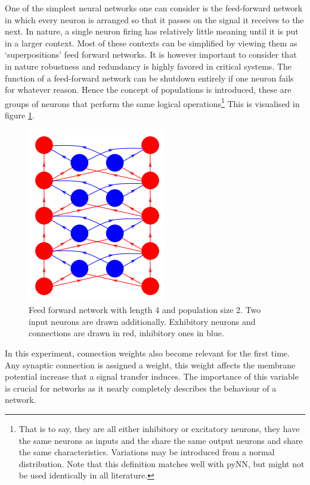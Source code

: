 \documentclass[a4paper,twocolumn]{article}
\begin{document}
One of the simplest neural networks one can consider is the feed-forward
network in which every neuron is arranged so that it passes on the signal it
receives to the next. In nature, a single neuron firing has relatively little
meaning until it is put in a larger context. Most of these contexts can be
simplified by viewing them as `superpositions' feed forward networks. It is
however important to consider that in nature robustness and redundancy is
highly favored in critical systems. The function of a feed-forward network can
be shutdown entirely if one neuron fails for whatever reason. Hence the concept
of populations is introduced, these are groups of neurons that perform the same
logical operations\footnote{That is to say, they are all either inhibitory or
excitatory neurons, they have the same neurons as inputs and the share the same
output neurons and share the same characteristics. Variations may be introduced
from a normal distribution. Note that this definition matches well with pyNN,
but might not be used identically in all literature.} This is visualised in
figure \ref{fig:feed-forward}.

\begin{figure}[ht]
    \centering
    \includegraphics[width=.3\textwidth]{figures/feedforward-real.png}
    \caption{Feed forward network with length 4 and population size 2. Two input
        neurons are drawn additionally. Exhibitory neurons and connections are drawn
        in red, inhibitory ones in blue.}
    \label{fig:feed-forward}
\end{figure}

In this experiment, connection weights also become relevant for the first time.
Any synaptic connection is assigned a weight, this weight affects the
membrane potential increase that a signal transfer induces. The importance of
this variable is crucial for networks as it nearly completely describes the
behaviour of a network.
\end{document}
